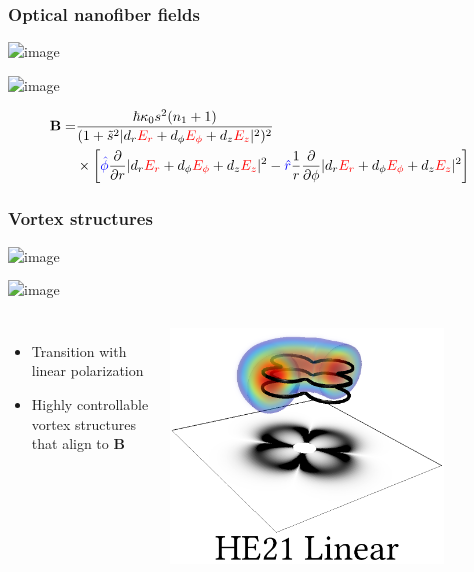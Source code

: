 \documentclass{beamer}
\begin{document}
\begin{frame}
\frametitle{Optical nanofiber fields}
\begin{center}
\includegraphics<1-2>[width=0.75\textwidth]{all_fields_1.png}

\includegraphics<3->[width=0.75\textwidth]{all_fields_2.png}
\end{center}

\vspace{-0.5cm}
\small{\begin{align}
\mathbf{B} =& \frac{\hbar \kappa_0 s^2(n_1 + 1)}{(1+\tilde s^2|d_r{\color{red}{E_r}} + d_{\phi}{\color{red}{E_{\phi}}} + d_z{\color{red}{E_z}}|^2)^2} \nonumber\\
&\times \bigg[ {\color{blue}{\hat\phi}}  \frac{\partial}{\partial r} |d_r{\color{red}{E_r}} + d_{\phi}{\color{red}{E_{\phi}}} + d_z{\color{red}{E_z}}|^2 - {\color{blue}{\hat r}} \frac{1}{r} \frac{\partial}{\partial \phi} |d_r{\color{red}{E_r}} + d_{\phi}{\color{red}{E_{\phi}}} + d_z{\color{red}{E_z}}|^2 \bigg ] \nonumber
\end{align}}
\end{frame}

\begin{frame}
\frametitle{Vortex structures}
\begin{center}
\includegraphics<1>[width=\textwidth]{vortex_transition_1.png}

\includegraphics<2->[width=\textwidth]{vortex_transition_2.png}
\end{center}
\begin{columns}
\begin{itemize}
\item Transition with linear polarization
\item Highly controllable vortex structures that align to $\mathbf{B}$
\end{itemize}
\center \includegraphics[width=0.8\textwidth]{HE21_3d.png}
\end{columns}
\end{frame}
\end{document}
